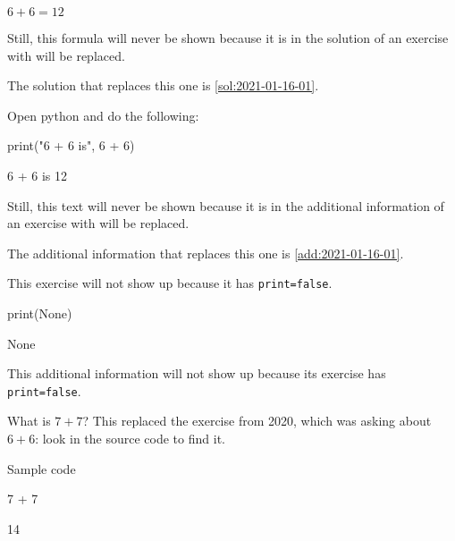 \documentclass[oneside]{book}
\begin{document}
\begin{solution}
  \(6 + 6 = 12\)

Still, this formula will never be shown because it is in the solution of an exercise with will be replaced.

The solution that replaces this one is \cref{sol:2021-01-16-01}.
\end{solution}

\begin{additionalinformation}
Open python and do the following:

\begin{pycell}
print("6 + 6 is", 6 + 6)
\end{pycell}
\begin{pyexpectedoutput}
6 + 6 is 12
\end{pyexpectedoutput}

Still, this text will never be shown because it is in the additional information of an exercise with will be replaced.

The additional information that replaces this one is \cref{add:2021-01-16-01}.
\end{additionalinformation}

\begin{exercise}[print=false]
This exercise will not show up because it has \texttt{print=false}.
\end{exercise}

\begin{solution}
\begin{pycell}
print(None)
\end{pycell}
\begin{pyexpectedoutput}
None
\end{pyexpectedoutput}
\end{solution}

\begin{additionalinformation}
This additional information will not show up because its exercise has \texttt{print=false}.
\end{additionalinformation}

\begin{exercise}[examdate={January 16, 2021}, examproblemnumber={1}, examproblemid={2021-01-16-01}]
  What is \(7 + 7\)? This replaced the exercise from 2020, which was asking about \(6 + 6\): look in the source code to find it.

Sample code
\begin{pycell}
7 + 7
\end{pycell}
\begin{pyexpectedoutput}
14
\end{pyexpectedoutput}
\end{exercise}
\end{document}
